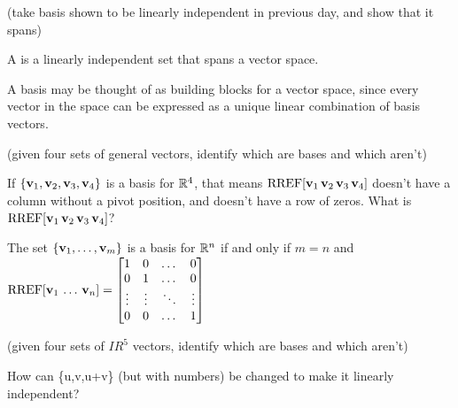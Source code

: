 
\begin{applicationActivities}{2}{14}

\begin{activity}{10}
  (take basis shown to be linearly independent in previous day, and
  show that it spans)
\end{activity}

\begin{definition}
  A  is a linearly independent set that spans a vector space.
\end{definition}

\begin{observation}
  A basis may be thought of as building blocks for a vector space, since
  every vector in the space can be expressed as a unique linear combination
  of basis vectors.
\end{observation}

\begin{activity}{10}
  (given four sets of general vectors, identify which are bases and which aren't)
\end{activity}

\begin{activity}{10}
  If \(\{\mathbf v_1,\mathbf v_2,\mathbf v_3,\mathbf v_4\}\) is a basis for
  \(\mathbb{R}^4\), that means \(\operatorname{RREF}[\mathbf v_1\,\mathbf v_2\,\mathbf v_3\,\mathbf v_4]\)
  doesn't have a column without a pivot position, and doesn't have a
  row of zeros. What is \(\operatorname{RREF}[\mathbf v_1\,\mathbf v_2\,\mathbf v_3\,\mathbf v_4]\)?
\end{activity}

\begin{fact}
  The set \(\{\mathbf v_1,\dots,\mathbf v_m\}\) is a basis for \(\mathbb{R}^n\) if and
  only if \(m=n\) and
  \(\operatorname{RREF}[\mathbf v_1\,\dots\,\mathbf v_n]=
  \begin{bmatrix}
    1&0&\dots&0\\
    0&1&\dots&0\\
    \vdots&\vdots&\ddots&\vdots\\
    0&0&\dots&1
  \end{bmatrix}
  \)
\end{fact}

\begin{activity}{10}
  (given four sets of \(IR^5\) vectors, identify which are bases and which
  aren't)
\end{activity}

\begin{activity}{10}
  How can \{u,v,u+v\} (but with numbers) be changed to make it
  linearly independent?
\end{activity}

\end{applicationActivities}
